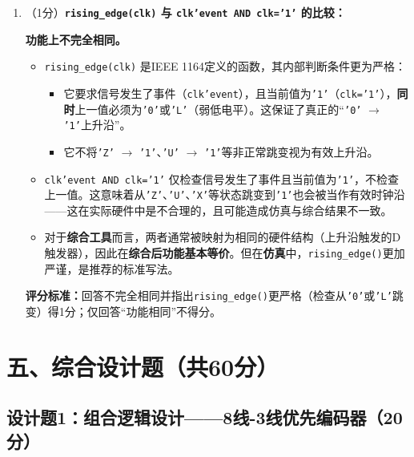 \begin{enumerate}[label=(\arabic*), leftmargin=*]
\medskip
\noindent\textbf{评分标准：}正确说明4个信号作用得1分（每个0.25分）；正确判断为异步复位并充分说明理由得1分。


\item （1分）\textbf{\texttt{rising\_edge(clk)} 与 \texttt{clk'event AND clk='1'} 的比较：}

\textbf{功能上不完全相同。}

\begin{itemize}
  \item \texttt{rising\_edge(clk)} 是IEEE 1164定义的函数，其内部判断条件更为严格：
  \begin{itemize}
    \item 它要求信号发生了事件（\texttt{clk'event}），且当前值为\texttt{'1'}（\texttt{clk='1'}），\textbf{同时}上一值必须为\texttt{'0'}或\texttt{'L'}（弱低电平）。这保证了真正的“\texttt{'0'} $\rightarrow$ \texttt{'1'}上升沿”。
    \item 它不将\texttt{'Z'} $\rightarrow$ \texttt{'1'}、\texttt{'U'} $\rightarrow$ \texttt{'1'}等非正常跳变视为有效上升沿。
  \end{itemize}
  \item \texttt{clk'event AND clk='1'} 仅检查信号发生了事件且当前值为\texttt{'1'}，不检查上一值。这意味着从\texttt{'Z'}、\texttt{'U'}、\texttt{'X'}等状态跳变到\texttt{'1'}也会被当作有效时钟沿——这在实际硬件中是不合理的，且可能造成仿真与综合结果不一致。
  \item 对于\textbf{综合工具}而言，两者通常被映射为相同的硬件结构（上升沿触发的D触发器），因此在\textbf{综合后}\textbf{功能基本等价}。但在\textbf{仿真}中，\texttt{rising\_edge()}更加严谨，是推荐的标准写法。
\end{itemize}

\noindent\textbf{评分标准：}回答不完全相同并指出\texttt{rising\_edge()}更严格（检查从\texttt{'0'}或\texttt{'L'}跳变）得1分；仅回答“功能相同”不得分。

\end{enumerate}

\newpage
\section{五、综合设计题（共60分）}

\subsection{设计题1：组合逻辑设计——8线-3线优先编码器（20分）}

